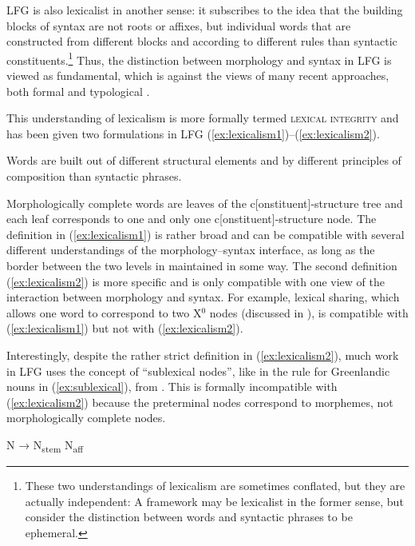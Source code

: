 \documentclass[output=paper,hidelinks]{langscibook}
\begin{document}
 LFG is also lexicalist in another sense: it subscribes to the idea that the building blocks of syntax are not roots or affixes, but individual words that are constructed from different blocks and according to different rules than syntactic constituents.\footnote{These two understandings of lexicalism are sometimes conflated, but they are actually independent: A framework may be lexicalist in the former sense, but consider the distinction between words and syntactic phrases to be ephemeral.} Thus, the distinction between morphology and syntax in LFG is viewed as fundamental, which is against the views of many recent approaches, both formal \parencite{bruening2018lexicalist} and typological \parencite{haspelmath2011}.
 
 This understanding of lexicalism is more formally termed \textsc{lexical integrity} and has been given two formulations in LFG (\ref{ex:lexicalism1})--(\ref{ex:lexicalism2}).
 
 \ea\label{ex:lexicalism1}
  Words are built out of different structural elements and by different principles of composition than syntactic phrases. \parencite[181]{bresnan1995the-lexical}
 \z

 \ea\label{ex:lexicalism2}
 Morphologically complete words are leaves of the c[onstituent]-structure tree and each leaf corresponds to one and only one c[onstituent]-structure node. \parencite[92]{BresnanEtAl2016}
 \z
The definition in (\ref{ex:lexicalism1}) is rather broad and can be compatible with several different understandings of the morphology--syntax interface, as long as the border between the two levels in maintained in some way. The second definition (\ref{ex:lexicalism2}) is more specific and is only compatible with one view of the interaction between morphology and syntax. For example, lexical sharing, which allows one word to correspond to two X$^0$ nodes (discussed in ), is compatible with (\ref{ex:lexicalism1}) but not with (\ref{ex:lexicalism2}).
 
 Interestingly, despite the rather strict definition in (\ref{ex:lexicalism2}), much work in LFG  uses the concept of ``sublexical nodes'', like in the rule for Greenlandic nouns in (\ref{ex:sublexical}), from \textcite[368]{BresnanEtAl2016}. This is formally incompatible with (\ref{ex:lexicalism2}) because the preterminal nodes correspond to morphemes, not morphologically complete nodes.
 
 \ea\label{ex:sublexical}
 N → N\textsubscript{stem} \quad N\textsubscript{aff}
 \z
 
\end{document}
